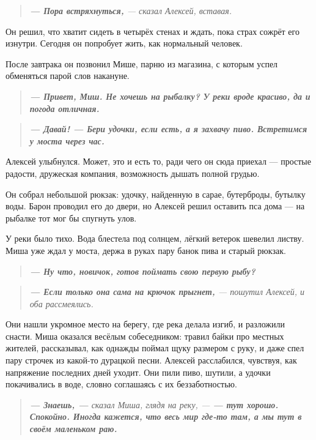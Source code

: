 \documentclass[12pt,a4paper]{book}
\newenvironment{dialogue}{\begin{quote}\itshape}{\end{quote}} %
\begin{document}
\begin{dialogue}
\textbf{--- Пора встряхнуться,} --- сказал Алексей, вставая.
\end{dialogue}

Он решил, что хватит сидеть в четырёх стенах и ждать, пока страх сожрёт его изнутри. Сегодня он попробует жить, как нормальный человек.

После завтрака он позвонил Мише, парню из магазина, с которым успел обменяться парой слов накануне.

\begin{dialogue}
\textbf{--- Привет, Миш. Не хочешь на рыбалку? У реки вроде красиво, да и погода отличная.}
\end{dialogue}

\begin{dialogue}
\textbf{--- Давай! --- Бери удочки, если есть, а я захвачу пиво. Встретимся у моста через час.}
\end{dialogue}

Алексей улыбнулся. Может, это и есть то, ради чего он сюда приехал --- простые радости, дружеская компания, возможность дышать полной грудью.

Он собрал небольшой рюкзак: удочку, найденную в сарае, бутерброды, бутылку воды. Барон проводил его до двери, но Алексей решил оставить пса дома --- на рыбалке тот мог бы спугнуть улов.

У реки было тихо. Вода блестела под солнцем, лёгкий ветерок шевелил листву. Миша уже ждал у моста, держа в руках пару банок пива и старый рюкзак.

\begin{dialogue}
\textbf{--- Ну что, новичок, готов поймать свою первую рыбу?}
\end{dialogue}

\begin{dialogue}
\textbf{--- Если только она сама на крючок прыгнет,} --- пошутил Алексей, и оба рассмеялись.
\end{dialogue}

Они нашли укромное место на берегу, где река делала изгиб, и разложили снасти. Миша оказался весёлым собеседником: травил байки про местных жителей, рассказывал, как однажды поймал щуку размером с руку, и даже спел пару строчек из какой-то дурацкой песни. Алексей расслабился, чувствуя, как напряжение последних дней уходит. Они пили пиво, шутили, а удочки покачивались в воде, словно соглашаясь с их беззаботностью.

\begin{dialogue}
\textbf{--- Знаешь, ---} сказал Миша, глядя на реку, --- \textbf{--- тут хорошо. Спокойно. Иногда кажется, что весь мир где-то там, а мы тут в своём маленьком раю.}
\end{dialogue}
\end{document}
